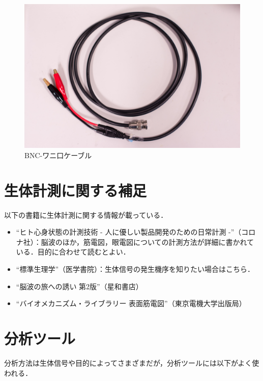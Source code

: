 \documentclass[a4j, twocolumn, openleft, uplatex, dvipdfmx]{jsbook}
\begin{document}
        \begin{figure}[H]
            \centering
            \includegraphics[width=\linewidth]{./figure/bnc-alligator.jpg}
            \caption{BNC-ワニ口ケーブル}
        \end{figure}

        \section{生体計測に関する補足}
        \label{sec:生体計測に関する補足}

        以下の書籍に生体計測に関する情報が載っている．

        \begin{itemize}
            \item ``\textsf{ヒト心身状態の計測技術
- 人に優しい製品開発のための日常計測 -}''（コロナ社）：脳波のほか，筋電図，眼電図についての計測方法が詳細に書かれている．目的に合わせて読むとよい．
            \item ``\textsf{標準生理学}''（医学書院）：生体信号の発生機序を知りたい場合はこちら．
            \item ``\textsf{脳波の旅への誘い 第2版}''（星和書店）
            \item ``\textsf{バイオメカニズム・ライブラリー 表面筋電図}''（東京電機大学出版局）
        \end{itemize}

        \section{分析ツール}
        \label{sec:分析ツール}

            分析方法は生体信号や目的によってさまざまだが，分析ツールには以下がよく使われる．
\end{document}

